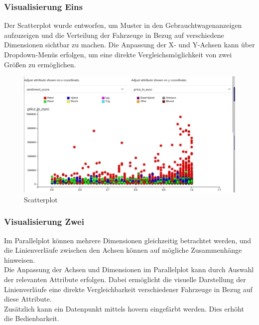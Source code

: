 \subsubsection{Visualisierung Eins}

Der Scatterplot wurde entworfen, um Muster in den Gebrauchtwagenanzeigen aufzuzeigen und die Verteilung der Fahrzeuge in Bezug auf verschiedene Dimensionen sichtbar zu machen. Die Anpassung der X- und Y-Achsen kann über Dropdown-Menüs erfolgen, um eine direkte Vergleichsmöglichkeit von zwei Größen zu ermöglichen.\\

\begin{figure}[H]
    \centering
    \includegraphics[width = \textwidth]{img/scatterplot.png}
    \caption{Scatterplot}
    \label{fig:scatter}
\end{figure}
\subsubsection{Visualisierung Zwei}

Im Parallelplot können mehrere Dimensionen gleichzeitig betrachtet werden, und die Linienverläufe zwischen den Achsen können auf mögliche Zusammenhänge hinweisen. \\
Die Anpassung der Achsen und Dimensionen im Parallelplot kann durch Auswahl der relevanten Attribute erfolgen. Dabei ermöglicht die visuelle Darstellung der Linienverläufe eine direkte Vergleichbarkeit verschiedener Fahrzeuge in Bezug auf diese Attribute. \\
Zusätzlich kann ein Datenpunkt mittels hovern eingefärbt werden. Dies erhöht die Bedienbarkeit. \\

